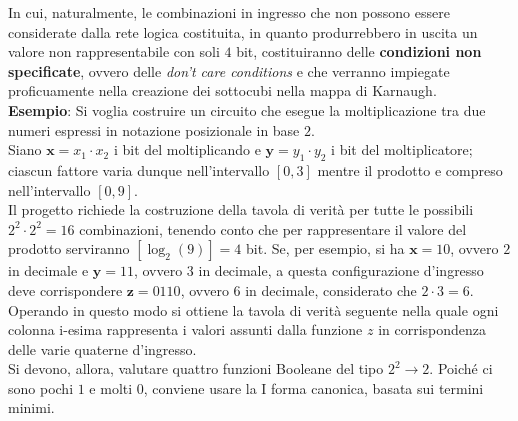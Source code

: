 \documentclass[a4paper]{extarticle}
\begin{document}
\noindent
In cui, naturalmente, le combinazioni in ingresso che non possono essere considerate dalla rete logica costituita, in quanto produrrebbero in uscita un valore non rappresentabile con soli \(4\) bit, costituiranno delle \textbf{condizioni non specificate}, ovvero delle \textit{don't care conditions} e che verranno impiegate proficuamente nella creazione dei sottocubi nella mappa di Karnaugh.\\

\vspace{1em}
\noindent
\textbf{Esempio}: Si voglia costruire un circuito che esegue la moltiplicazione tra due numeri espressi in notazione posizionale in base \(2\).\\
Siano \(\textbf{x} = x_1 \cdot x_2\) i bit del moltiplicando e \(\textbf{y} = y_1 \cdot y_2\) i bit del moltiplicatore; ciascun fattore varia dunque nell’intervallo \([0, 3]\) mentre il prodotto e compreso nell’intervallo \([0, 9]\).\\
Il progetto richiede la costruzione della tavola di verità per tutte le possibili \(2^2 \cdot 2^2 = 16\) combinazioni, tenendo conto
che per rappresentare il valore del prodotto serviranno \([\log_2 (9)] = 4\) bit. Se, per esempio, si ha \(\textbf{x} = 10\), ovvero \(2\) in decimale e \(\textbf{y} = 11\), ovvero \(3\) in decimale, a questa configurazione d’ingresso deve corrispondere \(\textbf{z} = 0110\), ovvero \(6\) in decimale, considerato che \(2 \cdot 3 = 6\).\\
Operando in questo modo si ottiene la tavola di verità seguente nella quale ogni colonna i-esima rappresenta i valori assunti dalla funzione \(z\) in corrispondenza delle varie quaterne d’ingresso.\\
Si devono, allora, valutare quattro funzioni Booleane del tipo \(2^2 \rightarrow 2\). Poiché ci sono pochi \(1\) e molti \(0\), conviene usare la I forma canonica, basata sui termini minimi.
\end{document}
